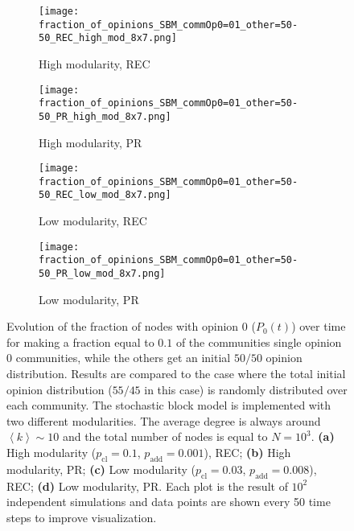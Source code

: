 \documentclass[11 pt , letterpaper , twoside , openright]{book}
\begin{document}
\begin{figure}[H]
  \begin{subfigure}[b]{0.49\textwidth}
  	\texttt{[image: fraction\_of\_opinions\_SBM\_commOp0=01\_other=50-50\_REC\_high\_mod\_8x7.png]}
    \caption{High modularity, REC}
    \label{high_mod_rec}
  \end{subfigure}
  \begin{subfigure}[b]{0.49\textwidth}
  	\texttt{[image: fraction\_of\_opinions\_SBM\_commOp0=01\_other=50-50\_PR\_high\_mod\_8x7.png]}
    \caption{High modularity, PR}
    \label{high_mod_pr}
  \end{subfigure}
  \begin{subfigure}[b]{0.49\textwidth}
    \texttt{[image: fraction\_of\_opinions\_SBM\_commOp0=01\_other=50-50\_REC\_low\_mod\_8x7.png]}
   \caption{Low modularity, REC}
    \label{low_mod_rec}
  \end{subfigure}
  \begin{subfigure}[b]{0.49\textwidth}
    \texttt{[image: fraction\_of\_opinions\_SBM\_commOp0=01\_other=50-50\_PR\_low\_mod\_8x7.png]}
    \caption{Low modularity, PR}
    \label{low_mod_pr}
  \end{subfigure}
  \captionsetup{format=plain}
  \caption[Evolution of the fraction of nodes with opinion 0 ($P_0(t)$) over time for making a fraction equal to $0.1$ of the communities single opinion 0 communities, while the others get an initial $50/50$ opinion distribution. Results are compared to the case where the total initial opinion distribution ($55/45$ in this case) is randomly distributed over each community.]{Evolution of the fraction of nodes with opinion 0 ($P_0(t)$) over time for making a fraction equal to $0.1$ of the communities single opinion 0 communities, while the others get an initial $50/50$ opinion distribution. Results are compared to the case where the total initial opinion distribution ($55/45$ in this case) is randomly distributed over each community. The stochastic block model is implemented with two different modularities. The average degree is always around $\left<k\right> \sim 10$ and the total number of nodes is equal to $N = 10^3$. \textbf{(a)} High modularity ($p_{\text{cl}} = 0.1$, $p_{\text{add}} = 0.001$), REC; \textbf{(b)} High modularity, PR; \textbf{(c)} Low modularity ($p_{\text{cl}} = 0.03$, $p_{\text{add}} = 0.008$), REC; \textbf{(d)} Low modularity, PR. Each plot is the result of $10^2$ independent simulations and data points are shown every 50 time steps to improve visualization.}
\label{commOp0_01_other_50-50}
\end{figure}
\end{document}
